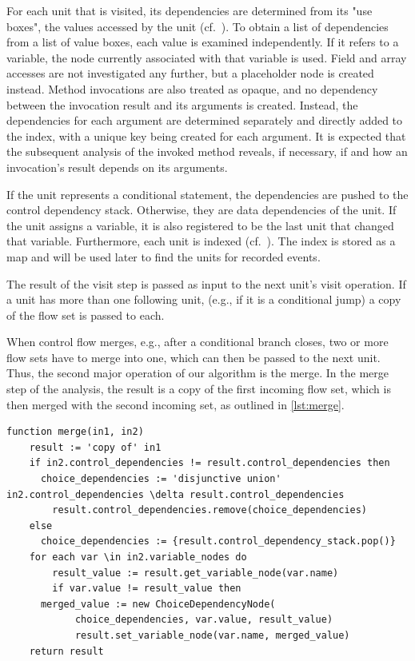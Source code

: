 For each unit that is visited, its dependencies are determined from its "use boxes", the values accessed by the unit (cf.~).
\tmpStart
To obtain a list of dependencies from a list of value boxes, each value is examined independently.
If it refers to a variable, the node currently associated with that variable is used.
Field and array accesses are not investigated any further, but a placeholder node is created instead.
Method invocations are also treated as opaque, and no dependency between the invocation result and its arguments is created.
Instead, the dependencies for each argument are determined separately and directly added to the index, with a unique key being created for each argument.
It is expected that the subsequent analysis of the invoked method reveals, if necessary, if and how an invocation's result depends on its arguments.
\tmpEnd

If the unit represents a conditional statement, the dependencies are pushed to the control dependency stack.
Otherwise, they are data dependencies of the unit.
If the unit assigns a variable, it is also registered to be the last unit that changed that variable.
Furthermore, each unit is indexed (cf.~).
The index is stored as a map and will be used later to find the units for recorded events.

The result of the visit step is passed as input to the next unit's visit operation.
If a unit has more than one following unit, (e.g., if it is a conditional jump) a copy of the flow set is passed to each.

When control flow merges, e.g., after a conditional branch closes, two or more flow sets have to merge into one, which can then be passed to the next unit.
Thus, the second major operation of our algorithm is the merge. 
In the merge step of the analysis, the result is a copy of the first incoming flow set, which is then merged with the second incoming set, as outlined in \cref{lst:merge}.

\begin{lstlisting}[firstnumber=1,float,caption={The algorithm of the merge operation.},stepnumber=5,label=lst:merge,gobble=0,language=algorithm,tabsize=2]
function merge(in1, in2)
	result := 'copy of' in1
	if in2.control_dependencies != result.control_dependencies then
	  choice_dependencies := 'disjunctive union' in2.control_dependencies \delta result.control_dependencies
		result.control_dependencies.remove(choice_dependencies)
	else
	  choice_dependencies := {result.control_dependency_stack.pop()}
	for each var \in in2.variable_nodes do
		result_value := result.get_variable_node(var.name)
		if var.value != result_value then
      merged_value := new ChoiceDependencyNode(
            choice_dependencies, var.value, result_value)
			result.set_variable_node(var.name, merged_value)
	return result
\end{lstlisting}


